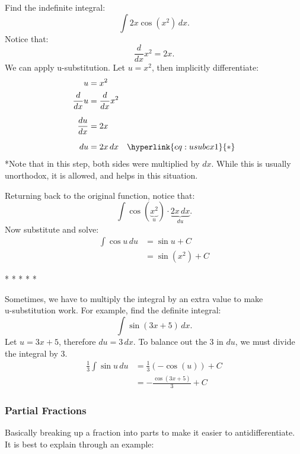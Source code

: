 \documentclass[12pt]{article}
\begin{document}
\noindent Find the indefinite integral:
\[ \int 2x \cos(x^2) \, dx. \]
\newline
Notice that:
\[ \frac{d}{dx} x^2 = 2x. \]
We can apply u-substitution. Let $u = x^2$, then implicitly differentiate:
\begin{align*}
    u              & = x^2                                      \\
    \frac{d}{dx} u & = \frac{d}{dx} x^2                         \\[6pt]
    \frac{du}{dx}  & = 2x                                       \\[6pt]
    du             & = 2x \, dx \quad \hyperlink{eq:usubex1}{*}
\end{align*}
\hypertarget{eq:usubex1}{*}Note that in this step, both sides were multiplied by $dx$. While this is usually unorthodox, it is allowed, and helps in this situation.
\bigskip

\noindent Returning back to the original function, notice that:
\[ \int \cos(\underbrace{x^2}_{u}) \cdot \underbrace{2x \, dx}_{du}. \]
Now substitute and solve:
\begin{align*}
    \int \cos{u} \, du & = \sin{u} + C   \\
                       & = \sin(x^2) + C
\end{align*}
\begin{center}
    * * * * *
\end{center}

Sometimes, we have to multiply the integral by an extra value to make \\u-substitution work. For example, find the definite integral: %
\[ \int \sin(3x+5) \, dx. \]
Let $u = 3x+5$, therefore $du = 3 \, dx$. To balance out the $3$ in $du$, we must divide the integral by $3$.
\begin{align*}
    \frac{1}{3} \int \sin{u} \, du & = \frac{1}{3} \left( -\cos(u) \right) + C \\[6pt]
                                   & = -\frac{\cos(3x+5)}{3} + C
\end{align*}

\subsubsection{Partial Fractions} %
Basically breaking up a fraction into parts to make it easier to antidifferentiate. It is best to explain through an example:
\end{document}
